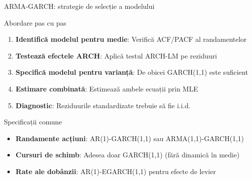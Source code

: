 \documentclass[9pt, aspectratio=169, t]{beamer}
\begin{document}
\begin{frame}{ARMA-GARCH: strategie de selecție a modelului}
    \small
        \begin{block}{Abordare pas cu pas}
            \begin{enumerate}
                \item \textbf{Identifică modelul pentru medie}: Verifică ACF/PACF al randamentelor
                \item \textbf{Testează efectele ARCH}: Aplică testul ARCH-LM pe reziduuri
                \item \textbf{Specifică modelul pentru varianță}: De obicei GARCH(1,1) este suficient
                \item \textbf{Estimare combinată}: Estimează ambele ecuații prin MLE
                \item \textbf{Diagnostic}: Reziduurile standardizate trebuie să fie i.i.d.
            \end{enumerate}
        \end{block}

        \vspace{0.2cm}

        \begin{alertblock}{Specificații comune}
            \begin{itemize}
                \item \textbf{Randamente acțiuni}: AR(1)-GARCH(1,1) sau ARMA(1,1)-GARCH(1,1)
                \item \textbf{Cursuri de schimb}: Adesea doar GARCH(1,1) (fără dinamică în medie)
                \item \textbf{Rate ale dobânzii}: AR(1)-EGARCH(1,1) pentru efecte de levier
            \end{itemize}
        \end{alertblock}
\end{frame}
\end{document}

